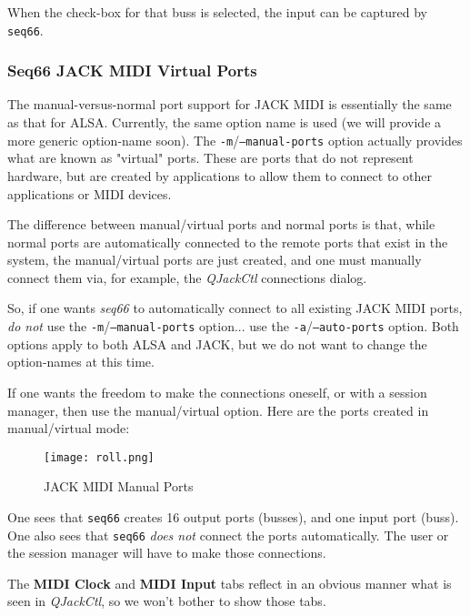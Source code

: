   When the check-box for that buss is selected, the input can be captured by
   \texttt{seq66}.

\subsubsection{Seq66 JACK MIDI Virtual Ports}
\label{subsubsec:jack_midi_virtual_ports}

   The manual-versus-normal port support for JACK MIDI is essentially the same
   as that for ALSA.  Currently, the same option name is used (we will provide
   a more generic option-name soon).
   The \texttt{-m}/\texttt{--manual-ports} option actually provides what
   are known as "virtual" ports.  These are ports that do not represent
   hardware, but are created by applications to allow them to connect to other
   applications or MIDI devices.

   The difference between manual/virtual ports and normal ports is that, while
   normal ports are automatically connected to the remote ports that exist in
   the system, the manual/virtual ports are just created, and one must
   manually connect them via, for example, the
   \textsl{QJackCtl} connections dialog.

   So, if one wants \textsl{seq66} to automatically connect to all existing
   JACK MIDI ports, \textsl{do not} use the
   \texttt{-m}/\texttt{--manual-ports} option... use the
   \texttt{-a}/\texttt{--auto-ports} option.  Both options apply to both
   ALSA and JACK, but we do not want to change the option-names at this time.

   If one wants the freedom to make the connections oneself, or with a session
   manager, then use the manual/virtual option.
   Here are the ports created in manual/virtual mode:

\begin{figure}[H]
   \centering 
   \texttt{[image: roll.png]}
   \caption{JACK MIDI Manual Ports}
   \label{fig:jack_nano_yosh_midi_manual}
\end{figure}

   One sees that \texttt{seq66} creates 16 output ports (busses), and one input
   port (buss).  One also sees that \texttt{seq66} \textsl{does not} connect
   the ports automatically.  The user or the session manager will have to make
   those connections.

   The \textbf{MIDI Clock} and \textbf{MIDI Input} tabs reflect in an obvious
   manner what is seen in \textsl{QJackCtl}, so we won't bother to show those
   tabs.

